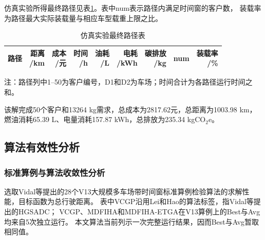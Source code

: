 \documentclass{setp-new}
\newcommand{\setptabsetup}{\small\renewcommand{\arraystretch}{0.95}\setlength{\tabcolsep}{2.2pt}\hbadness=10000}
\begin{document}
仿真实验所得最终路径见表\ref{tab:final-solution}。表中num表示路径内满足时间窗的客户数，
装载率为路径最大实际装载量与相应车型载重上限之比。

\begin{table}[H]
\centering
\setptabsetup
\caption{仿真实验最终路径表}\label{tab:final-solution}
\begin{tabular*}{\textwidth}{@{\extracolsep{\fill}}lrrrrrrrr@{}}
\toprule
路径 & \makecell{距离\\/km} & \makecell{成本\\/元} & \makecell{时间\\/h} & \makecell{油耗\\/L} & \makecell{电耗\\/kWh} & \makecell{碳排放\\/kg} & num & \makecell{装载率\\/\%}\\
\midrule

\end{tabular*}
\vspace{1pt}
\parbox{\textwidth}{\footnotesize 注：路径列中1--50为客户编号，D1和D2为车场；时间合计为各路径运行时间之和。}
\end{table}

该解完成50个客户和13264 kg需求，总成本为2817.62元，总距离为1003.98 km，
燃油消耗65.39 L、电量消耗157.87 kWh，总排放为235.34 kgCO$_2$e。

\subsection{算法有效性分析}

\subsubsection{标准算例与算法收敛性分析}

选取Vidal等提出的28个V13大规模多车场带时间窗标准算例检验算法的求解性能，目标函数为总行驶距离。
表中VCGP沿用Lei和Hao\cite{ref:75}的算法标签，指Vidal等提出的HGSADC\cite{ref:74}；
VCGP、MDFIHA和MDFIHA-ETGA在V13算例上的Best与Avg均来自5次独立运行。
本文算法当前列示一次完整运行结果，因而Best与Avg暂取相同值。
\end{document}
